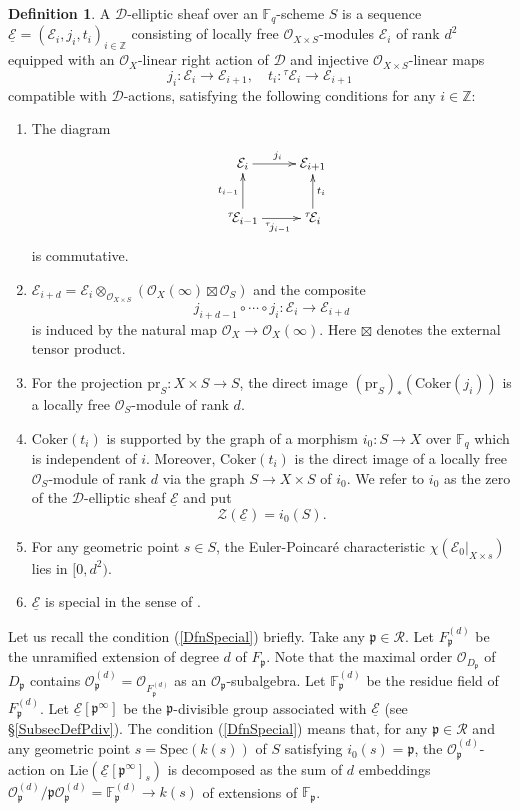 \documentclass[10pt]{amsart}
\theoremstyle{plain}
\theoremstyle{definition}
\newtheorem{dfn}[thm]{Definition}
\newcommand{\Coker}{\mathrm{Coker}}
\newcommand{\Lie}{\mathrm{Lie}}
\newcommand{\prjt}{\mathrm{pr}}
\newcommand{\Spec}{\mathrm{Spec}}
\newcommand{\cE}{\mathcal{E}}
\newcommand{\cO}{\mathcal{O}}
\newcommand{\cR}{\mathcal{R}}
\newcommand{\cZ}{\mathcal{Z}}
\newcommand{\ucE}{\underline{\mathcal{E}}}
\newcommand{\bF}{\mathbb{F}}
\newcommand{\bZ}{\mathbb{Z}}
\newcommand{\sD}{\mathscr{D}}
\newcommand{\frp}{\mathfrak{p}}
\begin{document}
\begin{dfn}\label{DfnDEll}
	A $\sD$-elliptic sheaf over an $\bF_q$-scheme $S$ is a sequence $\ucE=(\cE_i,j_i,t_i)_{i\in \bZ}$ consisting of
	locally free $\cO_{X\times S}$-modules $\cE_i$ of rank $d^2$ equipped with an $\cO_X$-linear right action of $\sD$ and injective
	$\cO_{X\times S}$-linear maps
	\[
	j_i: \cE_i\to \cE_{i+1},\quad t_i: {}^\tau\!\cE_i\to \cE_{i+1}
	\]
	compatible with $\sD$-actions, satisfying the following conditions for any $i\in \bZ$:
	\begin{enumerate}
		\item The diagram
		\[
		\xymatrix{
			\cE_i \ar[r]^{j_i}& \cE_{i+1}\\
			{}^\tau\!\cE_{i-1}\ar[r]_{{}^\tau\!j_{i-1}}\ar[u]^{t_{i-1}} & {}^\tau\!\cE_i\ar[u]_{t_i}
		}
		\]
		is commutative.
		
		\item\label{DfnPeriodicity} $\cE_{i+d}=\cE_i\otimes_{\cO_{X\times S}}(\cO_X(\infty)\boxtimes \cO_S)$ and the composite 
		\[
		j_{i+d-1}\circ\cdots \circ j_i:\cE_i\to \cE_{i+d}
		\]
		is
		induced by the natural map $\cO_X\to \cO_X(\infty)$. Here $\boxtimes$ denotes the external tensor product.
		
		\item For the projection $\prjt_S:X\times S\to S$, the direct image $(\prjt_S)_*(\Coker(j_i))$ is a locally free $\cO_S$-module 
		of rank $d$.
		
		\item\label{DfnZero} $\Coker(t_i)$ is supported by the graph of a morphism $i_{0}:S\to X$ over $\bF_q$ which is independent of $i$. 
		Moreover, $\Coker(t_i)$ 
		is the direct image of a locally free $\cO_S$-module of rank $d$
		via the graph $S\to X\times S$ of $i_{0}$. We refer to $i_0$ as the zero of the $\sD$-elliptic sheaf $\ucE$ and put
		\[
		\cZ(\ucE)=i_{0}(S).
		\]
		
		
		\item\label{DfnEuler} For any geometric point $s\in S$, the Euler-Poincar\'{e} characteristic $\chi(\cE_0|_{X\times s})$ lies in $[0,d^2)$. 
		
		\item\label{DfnSpecial} $\ucE$ is special in the sense of \cite[D\'{e}finition 3.5]{Hau}.
	\end{enumerate}
\end{dfn}

Let us recall the condition (\ref{DfnSpecial}) briefly. Take any $\frp\in \cR$.
Let $F_\frp^{(d)}$ be the unramified extension of degree $d$ of $F_\frp$. 
Note that the maximal order $\cO_{D_\frp}$ of $D_\frp$ contains $\cO_{\frp}^{(d)}=\cO_{F_\frp^{(d)}}$ as an $\cO_\frp$-subalgebra.
Let $\bF_\frp^{(d)}$ be the residue field of $F_\frp^{(d)}$.
Let $\ucE[\frp^\infty]$ be the $\frp$-divisible group associated with $\ucE$ (see \S\ref{SubsecDefPdiv}).
The condition (\ref{DfnSpecial}) means that,
for any $\frp\in \cR$ and any geometric point $s=\Spec(k(s))$ of $S$ satisfying $i_{0}(s)=\frp$, 
the $\cO_{\frp}^{(d)}$-action on $\Lie(\ucE[\frp^\infty]_s)$ is decomposed as the sum of $d$ embeddings
$\cO_{\frp}^{(d)}/\frp \cO_{\frp}^{(d)}=\bF_\frp^{(d)}\to k(s)$ of extensions of $\bF_\frp$.
\end{document}
